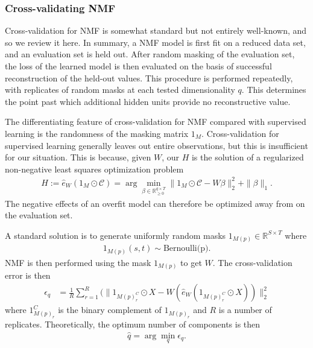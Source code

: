 \subsubsection{Cross-validating NMF}

Cross-validation for NMF is somewhat standard but not entirely well-known, and so we review it here.
In summary, a NMF model is first fit on a reduced data set, and an evaluation set is held out.
After random masking of the evaluation set, the loss of the learned model is then evaluated on the basis of successful reconstruction of the held-out values.
This procedure is performed repeatedly, with replicates of random masks at each tested dimensionality $q$.
This determines the point past which additional hidden units provide no reconstructive value.

The differentiating feature of cross-validation for NMF compared with supervised learning is the randomness of the masking matrix $1_M$.
Cross-validation for supervised learning generally leaves out entire observations, but this is insufficient for our situation.
This is because, given $W$, our $H$ is the solution of a regularized non-negative least squares optimization problem
\begin{eqnarray}
H := \widehat e_W(1_{M} \odot \mathcal C) = \arg \min_{\beta \in \mathbb R_{\geq 0}^{q \times T}} \|1_{M} \odot \mathcal C - W \beta\|_2^2 + \|\beta\|_1.
\label{eq:nmf_nnls}
\end{eqnarray}
The negative effects of an overfit model can therefore be optimized away from on the evaluation set.

A standard solution is to generate uniformly random masks $1_{M(p)} \in \mathbb R^{S \times T}$ where
\begin{align*}
1_{M(p)} (s,t) \sim \text{Bernoulli(p)}.
\end{align*}
NMF is then performed using the mask $1_{M(p)}$ to get $W$.
The cross-validation error is then
\begin{align*}
\epsilon_q &= \frac{1}{R} \sum_{r = 1}^R (\|1_{M(p)_r^C} \odot X - W (\widehat e_W (1_{M(p)_r^C} \odot X ))\|_2^2 
\end{align*}
where $1_{M(p)_r}^C$ is the binary complement of $1_{M(p)_r}$ and $R$ is a number of replicates.
Theoretically, the optimum number of components is then
\begin{align*}
    \widehat q = \arg \min_q \epsilon_q.
\end{align*}

